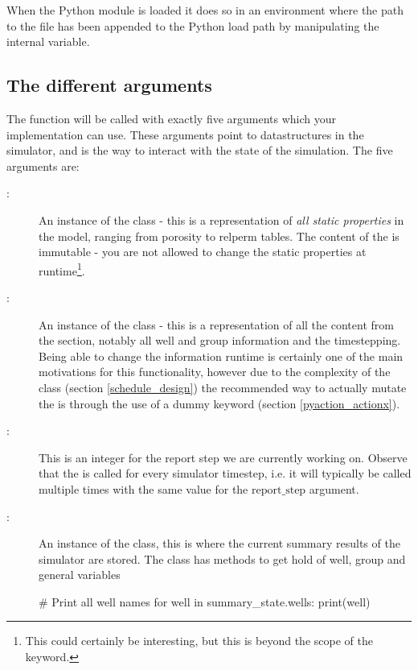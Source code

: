 When the Python module is loaded it does so in an environment where the path to
the  file has been appended to the Python load path by manipulating
the internal  variable.


\subsection{The different arguments}
The  function will be called with exactly five arguments which
your implementation can use. These arguments point to datastructures in the
simulator, and is the way to interact with the state of the simulation. The five
arguments are:
\begin{description}
\item[:] An instance of the 
  class - this is a representation of \emph{all static properties} in the model,
  ranging from porosity to relperm tables. The content of the
   is immutable - you are not allowed to change the static
  properties at runtime\footnote{This could certainly be interesting, but this
  is beyond the scope of the \pyaction{} keyword.}.
\item[:] An instance of the 
  class - this is a representation of all the content from the 
  section, notably all well and group information and the timestepping. Being
  able to change the  information runtime is certainly one of the
  main motivations for this functionality, however due to the complexity of
  the  class (section \ref{schedule_design})
  the recommended way to actually mutate the  is
  through the use of a dummy \actionx{} keyword (section
  \ref{pyaction_actionx}).
\item[:] This is an integer for the report step we
  are currently working on. Observe that the \pyaction{} is called for every
  simulator timestep, i.e. it will typically be called multiple times with
  the same value for the $\mathrm{report\_step}$ argument.
\item[:] An instance of the
   class, this is where the current summary
  results of the simulator are stored. The  class has
  methods to get hold of well, group and general variables
  \begin{code}
    # Print all well names
    for well in summary_state.wells:
        print(well)


\end{code}
\end{description}
